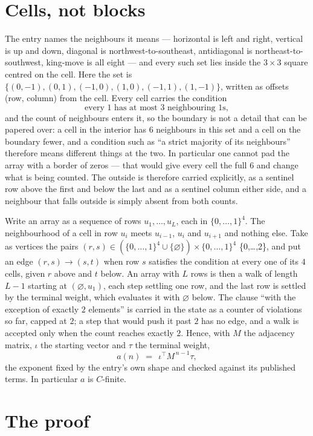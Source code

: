 \documentclass[11pt,a4paper]{article}
\theoremstyle{plain}
\theoremstyle{definition}
\begin{document}
\section{Cells, not blocks}

The entry names the neighbours it means --- horizontal is left and right, vertical is up and
down, diagonal is northwest-to-southeast, antidiagonal is northeast-to-southwest, king-move is
all eight --- and every such set lies inside the $3\times3$ square centred on the cell. Here
the set is $\{(0,-1), (0,1), (-1,0), (1,0), (-1,1), (1,-1)\}$, written as offsets (row, column) from the cell. Every cell carries
the condition
\[
\text{every 1 has at most 3 neighbouring 1s},
\]
and the count of neighbours enters it, so the boundary is not a detail that can be papered
over: a cell in the interior has $6$ neighbours in this set and a cell on the boundary
fewer, and a condition such as ``a strict majority of its neighbours'' therefore means
different things at the two. In particular one cannot pad the array with a border of zeros ---
that would give every cell the full $6$ and change what is being counted. The outside is
therefore carried
explicitly, as a sentinel row above the first and below the last and as a sentinel column
either side, and a neighbour that falls outside is simply absent from both counts.

Write an array as a sequence of rows $u_1,\dots,u_L$, each in
$\{0,\dots,1\}^{4}$. The neighbourhood of a cell in row $u_i$ meets $u_{i-1}$,
$u_i$ and $u_{i+1}$ and nothing else. Take as vertices the pairs
$(r,s)\in(\{0,\dots,1\}^{4}\cup\{\varnothing\})\times\{0,\dots,1\}^{4}$ \times \{0,\dots,2\},
and put an edge $(r,s)\to(s,t)$ when row $s$ satisfies the condition at every one of its
$4$ cells, given $r$ above and $t$ below. An array with $L$ rows is then a walk of length
$L-1$ starting at $(\varnothing,u_1)$, each step settling one row, and the last row is
settled by the terminal weight, which evaluates it with $\varnothing$ below. The clause ``with the exception of exactly $2$ elements'' is carried in
the state as a counter of violations so far, capped at $2$; a step that would push it past
$2$ has no edge, and a walk is accepted only when the count reaches exactly $2$. Hence,
with $M$ the adjacency matrix, $\iota$ the starting vector and $\tau$ the terminal weight,
\[
a(n)\;=\;\,\iota^{\!\top}M^{\,n-1}\tau ,
\]
the exponent fixed by the entry's own shape and checked against its published terms. In
particular $a$ is $C$-finite.

\section{The proof}
\end{document}

